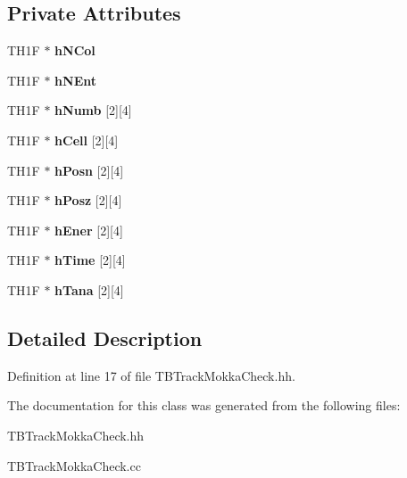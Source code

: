 \subsection*{Private Attributes}
\begin{DoxyCompactItemize}
\item 
TH1F $\ast$ {\bfseries hNCol}\label{classTBTrackMokkaCheck_a0c9c9c99f9b716dd1992bb4ef4dc9752}

\item 
TH1F $\ast$ {\bfseries hNEnt}\label{classTBTrackMokkaCheck_a82a95f726f0c9a6143a9841194f99352}

\item 
TH1F $\ast$ {\bfseries hNumb} [2][4]\label{classTBTrackMokkaCheck_a4b8496fa6e482d1b766d2a1bc4ea5601}

\item 
TH1F $\ast$ {\bfseries hCell} [2][4]\label{classTBTrackMokkaCheck_a8039a6724748c468801aed23e01069da}

\item 
TH1F $\ast$ {\bfseries hPosn} [2][4]\label{classTBTrackMokkaCheck_a18d21b8473903ebd1064262b5845411d}

\item 
TH1F $\ast$ {\bfseries hPosz} [2][4]\label{classTBTrackMokkaCheck_a1bf5a8ba5867ded6b37099192f65f233}

\item 
TH1F $\ast$ {\bfseries hEner} [2][4]\label{classTBTrackMokkaCheck_a206f00deb9d1f038f90c298885089a00}

\item 
TH1F $\ast$ {\bfseries hTime} [2][4]\label{classTBTrackMokkaCheck_a041d981e1fcd92559e117112986ef83d}

\item 
TH1F $\ast$ {\bfseries hTana} [2][4]\label{classTBTrackMokkaCheck_aca36bbd029605cb2ae4a0ca7c575ca65}

\end{DoxyCompactItemize}


\subsection{Detailed Description}


Definition at line 17 of file TBTrackMokkaCheck.hh.

The documentation for this class was generated from the following files:\begin{DoxyCompactItemize}
\item 
TBTrackMokkaCheck.hh\item 
TBTrackMokkaCheck.cc\end{DoxyCompactItemize}
